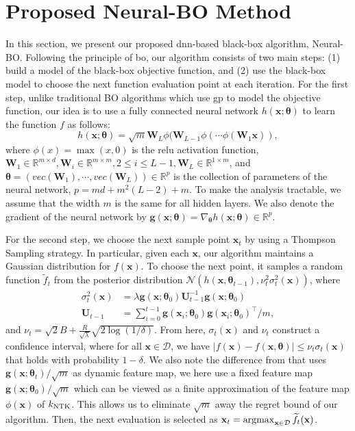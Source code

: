 \section{Proposed Neural-BO Method}
\label{section:neural-bo_proposed_method}
In this section, we present our proposed \ac{dnn}-based black-box algorithm, Neural-BO. Following the principle of \ac{bo}, our algorithm consists of two main steps: (1) build a model of the black-box objective function, and (2) use the black-box model to choose the next function evaluation point at each iteration. For the first step, unlike traditional BO algorithms which use \ac{gp} to model the objective function, our idea is to use a fully connected neural network $h(\mathbf{x}; \boldsymbol{\theta})$ to learn the function $f$ as follows:
$$ h(\mathbf{x};\boldsymbol{\theta}) = \sqrt{m} \mathbf{W}_L \phi(\mathbf{W}_{L-1}\phi(\cdots\phi(\mathbf{W}_1 \mathbf{x})), $$
where $\phi(x) = \max(x,0)$ is the \ac{relu} activation function, $\mathbf{W}_1 \in \mathbb{R}^{m \times d}, \mathbf{W}_i \in \mathbb{R}^{m \times m}, 2\leq i \leq L-1, \mathbf{W}_L \in \mathbb{R}^{1 \times m}$, and $\boldsymbol{\theta} = (vec(\mathbf{W}_1),\cdots, vec(\mathbf{W}_L)) \in \mathbb{R}^p$ is the collection of parameters of the neural network, $p=md+m^2(L-2)+m$. To make the analysis tractable, we assume that the width $m$ is the same for all hidden layers. We also denote the gradient of the neural network by $\mathbf{g}(\mathbf{x}; \boldsymbol{\theta}) = \nabla_{\boldsymbol{\theta}}h(\mathbf{x}; \boldsymbol{\theta}) \in \mathbb{R}^p$.

For the second step, we choose the next sample point $\mathbf{x}_t$ by using a Thompson Sampling strategy. In particular, given each $\mathbf{x}$, our algorithm maintains a Gaussian distribution for $f(\mathbf{x})$. To choose the next point, it samples a random function $\widetilde{f}_t$ from the posterior distribution $\mathcal{N}(h(\mathbf{x}, \boldsymbol{\theta}_{t-1}), \nu_t^2 \sigma^2_t (\mathbf{x}))$, where 
\begin{align*}
\sigma^2_t (\mathbf{x}) &= \lambda \mathbf{g}(\mathbf{x};\boldsymbol{\theta}_0)\mathbf{U}_{t-1}^{-1}\mathbf{g}(\mathbf{x};\boldsymbol{\theta}_0)
\\
\mathbf{U}_{t-1} &= \sum_{i=0}^{t-1} \mathbf{g}(\mathbf{x}_i;\boldsymbol{\theta}_0)\mathbf{g}(\mathbf{x}_i; \boldsymbol{\theta}_0)^\top/m,
\end{align*}
and $\nu_t = \sqrt{2}B +\frac{R}{\sqrt{\lambda}} \sqrt{2 \log(1/ \delta)}$. From here, $\sigma_t(\mathbf{x})$ and $\nu_t$ construct a confidence interval, where for all $\mathbf{x} \in \mathcal{D}$, we have $\lvert  f(\mathbf{x}) - f(\mathbf{x}, \boldsymbol{\theta}) \rvert \leq \nu_t\sigma_t(\mathbf{x})$ that holds with probability $1-\delta$. We also note the difference from \citet{zhang2021neural} that uses $\mathbf{g}(\mathbf{x};\boldsymbol{\theta}_t)/\sqrt{m}$ as dynamic feature map, we here use a fixed feature map $\mathbf{g}(\mathbf{x};\boldsymbol{\theta}_0)/\sqrt{m}$ which can be viewed as a finite approximation of the feature map $\phi(\mathbf{x})$ of $k_\textup{NTK}$. This allows us to eliminate $\sqrt{m}$ away the regret bound of our algorithm. Then, the next evaluation is selected as $\mathbf{x}_t = \operatorname*{argmax}_{\mathbf{x} \in \mathcal{D}} \widetilde{f_t}(\mathbf{x})$. 

